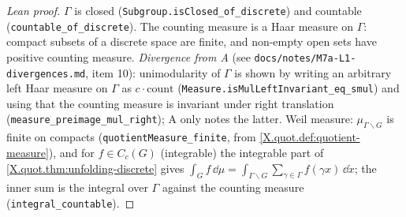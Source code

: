 \begin{proof}[Lean proof]
$\Gamma$ is closed (\texttt{Subgroup.isClosed\_of\_discrete}) and countable (\texttt{countable\_of\_discrete}). The counting measure is a Haar measure on $\Gamma$: compact subsets of a discrete space are finite, and non-empty open sets have positive counting measure. \emph{Divergence from A} (see \texttt{docs/notes/M7a-L1-divergences.md}, item 10): unimodularity of $\Gamma$ is shown by writing an arbitrary left Haar measure on $\Gamma$ as $c\cdot\mathrm{count}$ (\texttt{Measure.isMulLeftInvariant\_eq\_smul}) and using that the counting measure is invariant under right translation (\texttt{measure\_preimage\_mul\_right}); A only notes the latter. Weil measure: $\mu_{\Gamma\backslash G}$ is finite on compacts (\texttt{quotientMeasure\_finite}, from \cref{X.quot.def:quotient-measure}), and for $f\in C_c(G)$ (integrable) the integrable part of \cref{X.quot.thm:unfolding-discrete} gives $\int_Gf\,\dd\mu=\int_{\Gamma\backslash G}\sum_{\gamma\in\Gamma}f(\gamma x)\,\dd\dot x$; the inner sum is the integral over $\Gamma$ against the counting measure (\texttt{integral\_countable}).
\end{proof}

